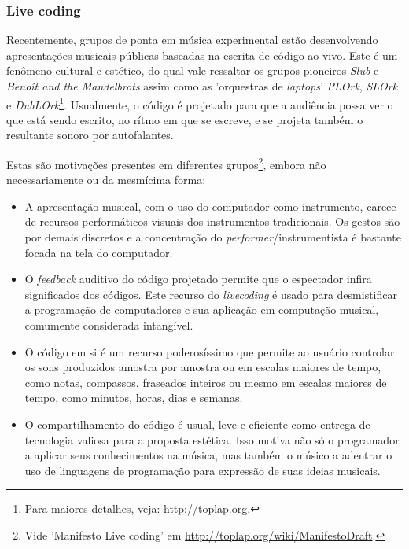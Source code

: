 \subsubsection{Live coding}

Recentemente, grupos de ponta em música experimental
estão desenvolvendo apresentações musicais públicas baseadas na
escrita de código ao vivo. Este é um fenômeno cultural e
estético, do qual vale ressaltar os grupos pioneiros
\emph{Slub} e \emph{Benoît and the Mandelbrots} assim como
as 'orquestras de \emph{laptops}'
\emph{PLOrk}, \emph{SLOrk} e \emph{DubLOrk}\footnote{Para maiores detalhes, veja:
  \url{http://toplap.org}.}. Usualmente, o código é projetado para que a
audiência possa ver o que está sendo escrito, no rítmo em que se
escreve, e se projeta também o resultante sonoro por autofalantes.



Estas são motivações presentes em diferentes
grupos\footnote{Vide 'Manifesto Live coding' em
  \url{http://toplap.org/wiki/ManifestoDraft}.}, embora não
necessariamente ou da mesmícima forma:

\begin{itemize}
    \item A apresentação musical, com o uso do computador como instrumento,
    carece de recursos
      performáticos visuais dos instrumentos tradicionais.
       Os gestos são por demais discretos e a
      concentração do \emph{performer}/instrumentista é bastante focada na tela do
      computador.
    \item O \emph{feedback} auditivo do código projetado permite que o
      espectador infira significados dos códigos. 
      Este recurso do \emph{livecoding} é usado para
      desmistificar a programação de computadores e sua aplicação em
      computação musical, comumente considerada
      intangível.
    \item O código em si é um recurso poderosíssimo que permite ao
      usuário controlar os sons produzidos amostra por amostra ou em
      escalas maiores de tempo, como notas, compassos, fraseados inteiros ou
      mesmo em escalas maiores de tempo, como minutos, horas, dias e
      semanas.
    \item O compartilhamento do código é usual, leve e eficiente como
      entrega de tecnologia valiosa para a
      proposta estética. Isso motiva não só o programador a aplicar
      seus conhecimentos na música, mas também o músico a adentrar o
      uso de linguagens de programação para expressão de suas ideias
      musicais.
\end{itemize}

